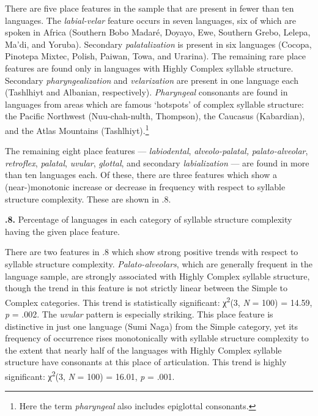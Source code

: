   There are five place features in the sample that are present in fewer than ten languages. The \textit{labial-velar} feature occurs in seven languages, six of which are spoken in Africa (Southern Bobo Madaré, Doyayo, Ewe, Southern Grebo, Lelepa, Ma’di, and Yoruba). Secondary \textit{palatalization} is present in six languages (Cocopa, Pinotepa Mixtec, Polish, Paiwan, Towa, and Urarina). The remaining rare place features are found only in languages with Highly Complex syllable structure. Secondary \textit{pharyngealization} and \textit{velarization} are present in one language each (Tashlhiyt and Albanian, respectively). \textit{Pharyngeal} consonants are found in languages from areas which are famous ‘hotspots’ of complex syllable structure: the Pacific Northwest (Nuu-chah-nulth, Thompson), the Caucasus (Kabardian), and the Atlas Mountains (Tashlhiyt).\footnote{ \textrm{Here the term} \textrm{\textit{pharyngeal} }\textrm{also includes epiglottal consonants.}}



  The remaining eight place features — \textit{labiodental}, \textit{alveolo-palatal,} \textit{palato-alveolar}, \textit{retroflex}, \textit{palatal}, \textit{uvular}, \textit{glottal}, and secondary \textit{labialization} — are found in more than ten languages each. Of these, there are three features which show a (near-)monotonic increase or decrease in frequency with respect to syllable structure complexity. These are shown in .8.





\textbf{.8.} Percentage of languages in each category of syllable structure complexity having the given place feature.



  There are two features in .8 which show strong positive trends with respect to syllable structure complexity. \textit{Palato-alveolars}, which are generally frequent in the language sample, are strongly associated with Highly Complex syllable structure, though the trend in this feature is not strictly linear between the Simple to Complex categories. This trend is statistically significant: χ\textsuperscript{2}(3, \textit{N} = 100) = 14.59, \textit{p} = .002. The \textit{uvular} pattern is especially striking. This place feature is distinctive in just one language (Sumi Naga) from the Simple category, yet its frequency of occurrence rises monotonically with syllable structure complexity to the extent that nearly half of the languages with Highly Complex syllable structure have consonants at this place of articulation. This trend is highly significant: χ\textsuperscript{2}(3, \textit{N} = 100) = 16.01, \textit{p} = .001. 




